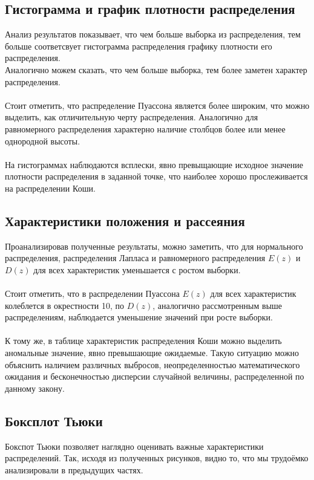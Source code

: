 \documentclass[a4paper,14pt]{article}
\begin{document}
	\subsection{Гистограмма и график плотности распределения}
	Анализ результатов показывает, что чем больше выборка из распределения, тем больше соответсвует гистограмма распределения графику плотности его распределения.\\
	Аналогично можем сказать, что чем больше выборка, тем более заметен характер распределения.
	~\\
	~\\
	Стоит отметить, что распределение Пуассона является более широким, что можно выделить, как отличительную черту распределения. Аналогично для равномерного распределения характерно наличие столбцов более или менее однородной высоты. 
	~\\
	~\\
	На гистограммах наблюдаются всплески, явно превыщающие исходное значение плотности распределения в заданной точке, что наиболее хорошо прослеживается на распределении Коши.
	
	\subsection{Характеристики положения и рассеяния}
	Проанализировав полученные результаты, можно заметить, что для нормального распределения, распределения Лапласа и равномерного распределения $E(z)$ и $D(z)$ для всех характеристик уменьшается с ростом выборки.
	~\\
	~\\
	Стоит отметить, что в распределении Пуассона $E(z)$ для всех характеристик колеблется  в окрестности 10, по $D(z)$, аналогично рассмотренным выше распределениям, наблюдается уменьшение значений при росте выборки.
	~\\
	~\\
	К тому же, в таблице характеристик распределения Коши можно выделить аномальные значение, явно превышающие ожидаемые. Такую ситуацию можно объяснить наличием различных выбросов, неопределенностью математического ожидания и бесконечностью дисперсии случайной величины, распределенной по данному закону.
	
	\subsection{Боксплот Тьюки}
	
	Бокспот Тьюки позволяет наглядно оценивать важные характеристики распределений. Так, исходя из полученных рисунков, видно то, что мы трудоёмко анализировали в предыдущих частях.
	
\end{document}
